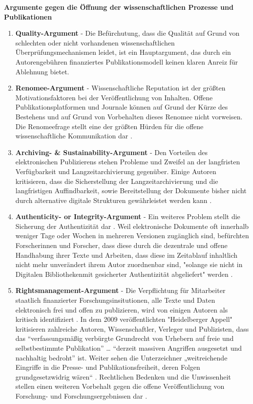\textbf{Argumente gegen die Öffnung der wissenschaftlichen Prozesse und Publikationen}
\begin{enumerate}
\item \textbf{Quality-Argument} - Die Befürchutung, dass die Qualität auf Grund von schlechten oder nicht vorhandenen wissenschaftlichen Überprüfungsmechanismen leidet, ist ein Hauptargument, das durch ein Autorengebühren finanziertes Publikationsmodell keinen klaren Anreiz für Ablehnung bietet.
\item \textbf{Renomee-Argument} - Wissenschaftliche Reputation ist der größten Motivationsfaktoren bei der Veröffentlichung von Inhalten. Offene Publikationsplatformen und Journale können auf Grund der Kürze des Bestehens und auf Grund von Vorbehalten dieses Renomee nicht vorweisen. Die Renomeefrage stellt eine der größten Hürden für die offene wissenschaftliche Kommunikation dar \cite{weishaupt_2009_goldenOA}.
\item \textbf{Archiving- & Sustainability-Argument} - Den Vorteilen des elektronischen Publizierens stehen Probleme und Zweifel an der langfristen Verfügbarkeit und Langzeitarchivierung \cite{weishaupt_2009_goldenOA} gegenüber. Einige Autoren kritisieren, dass die Sicherstellung der Langzeitarchivierung und die langfristigen Auffindbarkeit, sowie Bereitstellung der Dokumente bisher nicht durch alternative digitale Strukturen gewährleistet werden kann \cite{umstatter_2007_qualitatssicherung}.
\item \textbf{Authenticity- or Integrity-Argument} - Ein weiteres Problem stellt die Sicherung der Authentizität dar \cite{umstatter_2007_qualitatssicherung} \cite{weishaupt_2009_goldenOA}. Weil elektronische Dokumente oft innerhalb weniger Tage oder Wochen in mehreren Versionen zugänglich sind, befürchten Forscherinnen und Forscher, dass diese durch die dezentrale und offene Handhabung ihrer Texte und Arbeiten, dass diese im Zeitablauf inhaltlich nicht mehr unverändert ihrem Autor zuordnenbar sind, "solange sie nicht in Digitalen Bibliothekenmit gesicherter Authentizität abgeliefert" werden \cite{umstatter_2007_qualitatssicherung}.
\item \textbf{Rightsmanagement-Argument} - Die Verpflichtung für Mitarbeiter staatlich finanzierter Forschungsinsitutionen, alle Texte und Daten elektronisch frei und offen zu publizieren, wird von einigen Autoren als kritisch identifiziert \cite{suchen}. In dem 2009 veröffentlichten "Heidelberger Appell" \cite{faz_heidelberger_apell_2009} kritisieren zahlreiche Autoren, Wissenschaftler, Verleger und Publizisten, dass das “verfassungsmäßig verbürgte Grundrecht von Urhebern auf freie und selbstbestimmte Publikation” … “derzeit massiven Angriffen ausgesetzt und nachhaltig bedroht” ist. Weiter sehen die Unterzeichner „weitreichende Eingriffe in die Presse- und Publikationsfreiheit, deren Folgen grundgesetzwidrig wären“ \cite{ITK_2009}. Rechtlichen Bedenken und die Unwissenheit stellen einen weiteren Vorbehalt gegen die offene Veröffentlichung von Forschung- und Forschungsergebnissen dar \cite{weishaupt_2009_goldenOA}.

\end{enumerate}
